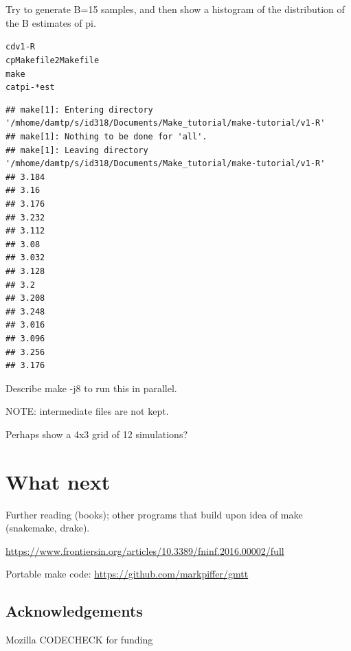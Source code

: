\documentclass[12pt]{article}\usepackage[]{graphicx}\usepackage[]{color}
\makeatletter
\newenvironment{kframe}{%
 \def\at@end@of@kframe{}%
 \ifinner\ifhmode%
  \def\at@end@of@kframe{\end{minipage}}%
  \begin{minipage}{\columnwidth}%
 \fi\fi%
 \def\FrameCommand##1{\hskip\@totalleftmargin \hskip-\fboxsep
 \colorbox{shadecolor}{##1}\hskip-\fboxsep
     \hskip-\linewidth \hskip-\@totalleftmargin \hskip\columnwidth}%
 \MakeFramed {\advance\hsize-\width
   \@totalleftmargin\z@ \linewidth\hsize
   \@setminipage}}%
 {\par\unskip\endMakeFramed%
 \at@end@of@kframe}
\newenvironment{knitrout}{}{} %
\makeatother
\begin{document}
\fbox{}

Try to generate B=15 samples, and then show a histogram of the
distribution of the B estimates of pi.


\begin{knitrout}
\color{fgcolor}\begin{kframe}
\begin{alltt}
cd v1-R
cp Makefile2 Makefile
make 
cat pi-*est
\end{alltt}

\begin{verbatim}
## make[1]: Entering directory '/mhome/damtp/s/id318/Documents/Make_tutorial/make-tutorial/v1-R'
## make[1]: Nothing to be done for 'all'.
## make[1]: Leaving directory '/mhome/damtp/s/id318/Documents/Make_tutorial/make-tutorial/v1-R'
## 3.184
## 3.16
## 3.176
## 3.232
## 3.112
## 3.08
## 3.032
## 3.128
## 3.2
## 3.208
## 3.248
## 3.016
## 3.096
## 3.256
## 3.176
\end{verbatim}
\end{kframe}
\end{knitrout}


Describe make -j8 to run this in parallel.


NOTE: intermediate files are not kept.  

Perhaps show a 4x3 grid of 12 simulations?

\section{What next}

Further reading (books); other programs that build upon idea of make
(snakemake, drake).

\url{https://www.frontiersin.org/articles/10.3389/fninf.2016.00002/full}

Portable make code: \url{https://github.com/markpiffer/gmtt}


\subsection{Acknowledgements}

Mozilla CODECHECK for funding
\end{document}
